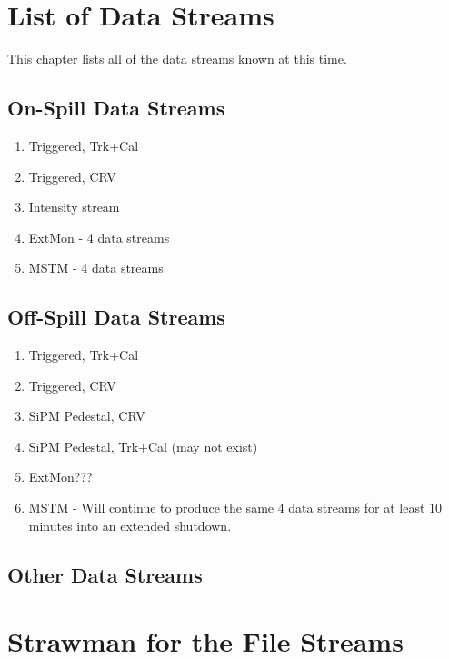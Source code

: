 \chapter{List of Data Streams}
\label{ch:data_streams}

This chapter lists all of the data streams known at this time.

\section{On-Spill Data Streams}
\label{sec:on_spill_data_streams}

\begin{enumerate}
\item Triggered, Trk+Cal
\item Triggered, CRV
\item Intensity stream
\item ExtMon - 4 data streams
\item MSTM - 4 data streams
\end{enumerate}

\section{Off-Spill Data Streams}
\label{sec:off_spill_data_streams}

\begin{enumerate}
\item Triggered, Trk+Cal
\item Triggered, CRV
\item SiPM Pedestal, CRV
  \item SiPM Pedestal, Trk+Cal (may not exist)
\item ExtMon???
\item MSTM - Will continue to produce the same 4 data streams for at least 10 minutes into an extended shutdown.
\end{enumerate}

\section{Other Data Streams}
\label{sec:Other_data_streams}

\chapter{Strawman for the File Streams}
\label{ch:file_streams}


